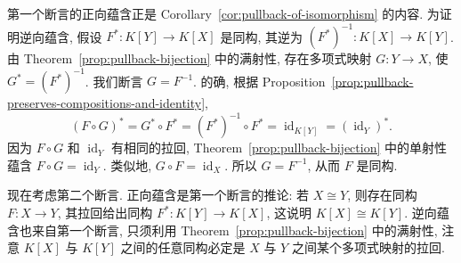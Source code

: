 \begin{Proof}
  第一个断言的正向蕴含正是 Corollary~\ref{cor:pullback-of-isomorphism} 的内容. 为证明逆向蕴含, 假设 $F^{*}:K[Y]\to K[X]$ 是同构, 其逆为 $(F^{*})^{-1}:K[X]\to K[Y]$. 由 Theorem~\ref{prop:pullback-bijection} 中的满射性, 存在多项式映射 $G:Y\to X$, 使 $G^{*}=(F^{*})^{-1}$. 我们断言 $G=F^{-1}$. 的确, 根据 Proposition~\ref{prop:pullback-preserves-compositions-and-identity},
  \[
    (F\circ G)^{*}=G^{*}\circ F^{*}=(F^{*})^{-1}\circ F^{*}
      =\operatorname{id}_{K[Y]}=(\operatorname{id}_{Y})^{*}.
  \]
  因为 $F\circ G$ 和 $\operatorname{id}_{Y}$ 有相同的拉回, Theorem~\ref{prop:pullback-bijection} 中的单射性蕴含 $F\circ G=\operatorname{id}_{Y}$. 类似地, $G\circ F=\operatorname{id}_{X}$. 所以 $G=F^{-1}$, 从而 $F$ 是同构.

  现在考虑第二个断言. 正向蕴含是第一个断言的推论: 若 $X\cong Y$, 则存在同构 $F:X\to Y$, 其拉回给出同构 $F^{*}:K[Y]\to K[X]$, 这说明 $K[X]\cong K[Y]$. 逆向蕴含也来自第一个断言, 只须利用 Theorem~\ref{prop:pullback-bijection} 中的满射性, 注意 $K[X]$ 与 $K[Y]$ 之间的任意同构必定是 $X$ 与 $Y$ 之间某个多项式映射的拉回.
\end{Proof}

